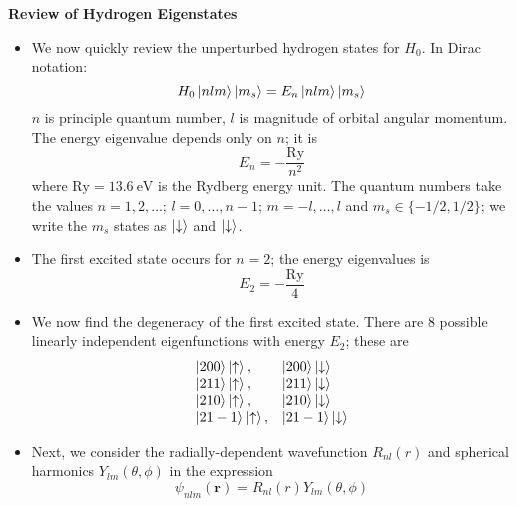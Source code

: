 \documentclass[11pt, a4paper]{article}
\renewcommand{\vec}[1]{\bm{#1}} %
\newcommand{\p}{\psi}  %
\renewcommand{\r}{\vec{r}}  %
\newcommand{\ua}{\uparrow}  %
\newcommand{\da}{\downarrow}  %
\begin{document}
\textbf{Review of Hydrogen Eigenstates}
\begin{itemize}
	\item We now quickly review the unperturbed hydrogen states for $ H_{0} $. In Dirac notation:
	\begin{equation*}
		H_{0}\ket{nlm}\ket{m_{s}} = E_{n} \ket{nlm}\ket{m_{s}}
	\end{equation*}
	$ n $ is principle quantum number, $ l $ is magnitude of orbital angular momentum.  The energy eigenvalue depends only on $ n $; it is
	\begin{equation*}
		E_{n} = - \frac{\mathrm{Ry}}{n^{2}}
	\end{equation*}
	where $\mathrm{Ry} = \SI{13.6}{\electronvolt} $ is the Rydberg energy unit. The quantum numbers take the values $ n = 1, 2, \ldots $; $ l = 0, \ldots, n-1 $; $ m = -l, \ldots, l $ and $ m_{s} \in \{-1/2, 1/2\} $; we write the $ m_{s} $ states as $ \ket{\da} $ and $ \ket{\da} $. 
	
	\item The first excited state occurs for $ n = 2 $; the energy eigenvalues is 
	\begin{equation*}
		E_{2} = - \frac{\mathrm{Ry}}{4}
	\end{equation*}
	
	\item We now find the degeneracy of the first excited state. There are 8 possible linearly independent eigenfunctions with energy $ E_{2} $; these are
	\[
	\begin{array}{ll}
		\ket{200}\ket{\ua}, & \ket{200}\ket{\da}\\
		\ket{211}\ket{\ua}, & \ket{211}\ket{\da}\\
		\ket{210}\ket{\ua}, & \ket{210}\ket{\da}\\
		\ket{21-1}\ket{\ua}, & \ket{21-1}\ket{\da}
	\end{array}
	\]
	
	\item Next, we consider the radially-dependent wavefunction $ R_{nl}(r) $ and spherical harmonics $ Y_{lm}(\theta, \phi) $ in the expression
	\begin{equation*}
		\p_{nlm}(\r) = R_{nl}(r) Y_{lm}(\theta, \phi)
	\end{equation*}
	

\end{itemize}
\end{document}
